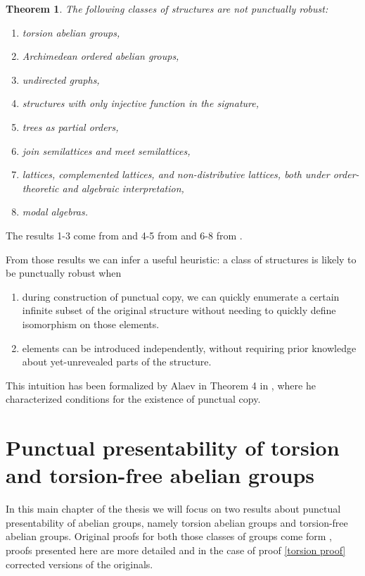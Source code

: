 \documentclass{pracalicmgr2025}
\theoremstyle{plain}            %
\newtheorem{theorem}{Theorem}[chapter]
\theoremstyle{remark}           %
\theoremstyle{definition}       %
\begin{document}
\begin{theorem} \label{negative robust}
     The following classes of structures are not punctually robust: 
     \begin{enumerate} [noitemsep, topsep=0pt]
         \item torsion abelian groups,
         \item Archimedean ordered abelian groups,
         \item undirected graphs,
         \item structures with only injective function in the signature,
         \item trees as partial orders,
         \item join semilattices and meet semilattices,
         \item lattices, complemented lattices, and non-distributive lattices,
both under order-theoretic and algebraic interpretation,
         \item  modal algebras.
         
     \end{enumerate}
\end{theorem}
The results 1-3 come from \cite{3} and 4-5 from \cite{kalocinski_et_al:LIPIcs.MFCS.2024.65} and 6-8 from \cite{bazhenov2025onlinefeasiblepresentabilitytrees}.
\medskip


From those results we can infer a useful heuristic: a class of structures is likely to be punctually robust when
\begin{enumerate}
    \item during construction of punctual copy, we can quickly enumerate a certain infinite subset of the original structure without needing to quickly define isomorphism on those elements.
    \item elements can be introduced independently, without requiring prior knowledge about yet-unrevealed parts of the structure.
\end{enumerate}
This intuition has been formalized by Alaev in Theorem 4 in \cite{Alaev2025}, where he characterized conditions for the existence of punctual copy. 




\chapter{Punctual presentability of torsion and torsion-free abelian groups} \label{Results about punctual presentability of abelian groups}
In this main chapter of the thesis we will focus on two results about punctual presentability of abelian groups, namely torsion abelian groups and torsion-free abelian groups. Original proofs for both those classes of groups come form \cite{3}, proofs presented here are more detailed and in the case of proof \ref{torsion proof} corrected versions of the originals.  
\end{document}
